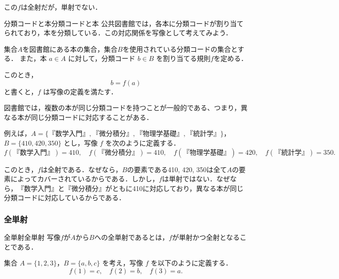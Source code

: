 \documentclass[a4paper,11pt]{ltjsarticle}
\begin{document}
この$f$は全射だが，単射でない．

\begin{example}{分類コードと本}{分類コードと本}
  公共図書館では，各本に分類コードが割り当てられており，本を分類している．この対応関係を写像として考えてみよう．

  集合$A$を図書館にある本の集合，集合$B$を使用されている分類コードの集合とする．
  また，本 $a \in A$ に対して，分類コード $b \in B$ を割り当てる規則$f$を定める．

  このとき，
  \[
    b = f(a)
  \]
  と書くと，$f$ は写像の定義を満たす．

  図書館では，複数の本が同じ分類コードを持つことが一般的である、つまり，異なる本が同じ分類コードに対応することがある．

  例えば，$A = \{\text{『数学入門』}, \text{『微分積分』}, \text{『物理学基礎』}, \text{『統計学』}\}$，
  $B = \{\text{410}, \text{420}, \text{350}\}$ とし，写像 $f$ を次のように定義する．
  \[
    f(\text{『数学入門』}) = 410, \quad
    f(\text{『微分積分』}) = 410, \quad
    f(\text{『物理学基礎』}) = 420, \quad
    f(\text{『統計学』}) = 350.
  \]

  このとき，$f$は全射である．なぜなら，$B$の要素である410, 420, 350は全て$A$の要素によってカバーされているからである．しかし，$f$は単射ではない．なぜなら，$\text{『数学入門』}$と$\text{『微分積分』}$がともに410に対応しており，異なる本が同じ分類コードに対応しているからである．

\end{example}


\subsubsection{全単射}

\begin{definition}{全単射}{全単射}
  写像$f$が$A$から$B$への全単射であるとは，$f$が単射かつ全射となることである．
\end{definition}

集合 $A = \{1, 2, 3\}$，$B = \{a, b, c\}$ を考え，写像 $f$ を以下のように定義する．
\[
  f(1) = c, \quad f(2) = b, \quad f(3) = a.
\]
\end{document}
